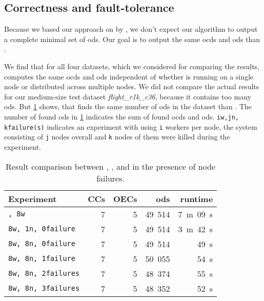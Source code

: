 \subsection{Correctness and fault-tolerance}\label{sec:evaluation:correctness}

  Because we based our approach on \ocddiscover{} by \citeauthor{consonni}, we don't expect our algorithm to output a complete minimal set of \glspl{od}.
  Our goal is to output the same \glspl{ocd} and \glspl{od} than \ocddiscover{}.

  We find that for all four datasets, which we considered for comparing the results, \dodo{} computes the same \glspl{ocd} and \glspl{od} independent of whether \dodo{} is running on a single node or distributed across multiple nodes.
  We did not compare the actual results for our medium-size test dataset \textit{flight\_r1k\_c36}, because it contains too many \glspl{od}.
  But \cref{tab:results} shows, that \dodo{} finds the same number of \glspl{od} in the dataset than \ocddiscover{}.
  The number of found \glspl{od} in \cref{tab:results} indicates the sum of found \glspl{ocd} and \glspl{od}.
  \texttt{iw,jn, kfailure(s)} indicates an experiment with \dodo{} using \texttt{i} workers per node, the system consisting of \texttt{j} nodes overall and \texttt{k} nodes of them were killed during the experiment.

  \begin{table}
    \centering
    \begin{tabular}{lrrrr}
      \toprule
      \textbf{Experiment} & \textbf{CCs} & \textbf{OECs} & \textbf{\glspl{od}} & \textbf{runtime} \\
      \midrule
      \texttt{\ocddiscover{}, 8w} & 7 & 5 & 49~514 & 7~m~09~s \\
      \texttt{8w, 1n, 0failure} & 7 & 5 & 49~514 & 3~m~42~s \\
      \texttt{8w, 8n, 0failure} & 7 & 5 & 49~514 & 49~s \\
      \texttt{8w, 8n, 1failure} & 7 & 5 & 50~055 & 54~s \\
      \texttt{8w, 8n, 2failures} & 7 & 5 & 48~374 & 55~s \\
      \texttt{8w, 8n, 3failures} & 7 & 5 & 48~352 & 52~s \\
      \bottomrule
    \end{tabular}
    \caption{Result comparison between \ocddiscover{}, \dodo{}, and \dodo{} in the presence of node failures.}
    \label{tab:results}
  \end{table}

